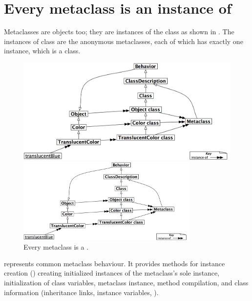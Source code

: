 \documentclass[a4paper,10pt,twoside]{book}
\begin{document}
\section{Every metaclass is an instance of }

Metaclasses are objects too; they are instances of the class  as shown in . The instances of class  are the anonymous metaclasses, each of which 
has exactly one instance, which is a class.

\begin{center}
\begin{figure}
\ifluluelse
	{\centerline{\includegraphics[width=\textwidth]{TranslucentMetaclassClass}}}
	{\centerline{\includegraphics[width=0.8\textwidth]{TranslucentMetaclassClass}}}
\caption{Every metaclass is a .\label{fig:metaclassclass}}
\end{figure}
\end{center}

 represents common metaclass behaviour.
It provides methods for instance creation ()
creating initialized instances of the metaclass's sole instance,
initialization of class variables,
metaclass instance,
method compilation, %
and class information (inheritance links, instance variables, \etc).
\end{document}
